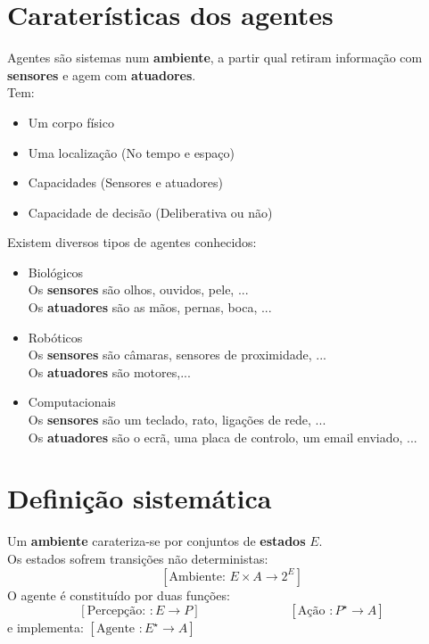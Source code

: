 \documentclass[]{report}
\begin{document}
\section{Caraterísticas dos agentes}
Agentes são sistemas num \textbf{ambiente}, a partir qual retiram informação com \textbf{sensores} e agem com \textbf{atuadores}.\\
Tem:
\begin{multicols}{2}
\begin{itemize}
\item Um corpo físico
\item Uma localização (No tempo e espaço)
\item Capacidades (Sensores e atuadores)
\item Capacidade de decisão (Deliberativa ou não)
\end{itemize}
\end{multicols}
Existem diversos tipos de agentes conhecidos:
\begin{itemize}
\item Biológicos\\
Os \textbf{sensores} são olhos, ouvidos, pele, ...\\
Os \textbf{atuadores} são as mãos, pernas, boca, ...
\item Robóticos\\
Os \textbf{sensores} são câmaras, sensores de proximidade, ...\\
Os \textbf{atuadores} são motores,...
\item Computacionais\\
Os \textbf{sensores} são um teclado, rato, ligações de rede, ...\\
Os \textbf{atuadores} são o ecrã, uma placa de controlo, um email enviado, ...
\end{itemize}
\section{Definição sistemática}
Um \textbf{ambiente} carateriza-se por conjuntos de \textbf{estados} $E$.\\
Os estados sofrem transições não deterministas:
$$[ \text{Ambiente: } E \times A \to 2^E]$$ %
O agente é constituído por duas funções:
$$[\text{Percepção: }: E \to P] \hspace{3cm} [\text{Ação }: P^{\star} \to A]$$
e implementa: $[\text{Agente }: E^\star \to A]$
\end{document}
